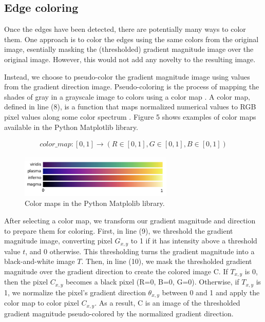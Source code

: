 \documentclass[runningheads]{llncs}
\begin{document}
\subsection{Edge coloring}

Once the edges have been detected, there are potentially many ways to color them. One approach is to color the edges using the same colors from the original image, esentially masking the (thresholded) gradient magnitude image over the original image. However, this would not add any novelty to the resulting image.

Instead, we choose to pseudo-color the gradient magnitude image using values from the gradient direction image. Pseudo-coloring is the process of mapping the shades of gray in a grayscale image to colors using a color map \cite{pseudo_color}. A color map, defined in line (8), is a function that maps normalized numerical values to RGB pixel values along some color spectrum \cite{color_map}. Figure 5 shows examples of color maps available in the Python Matplotlib library.

\begin{align}
color\_map: [0, 1] \rightarrow (R \in [0,1], G \in [0,1], B \in [0,1])
\end{align}

\begin{figure}
\centering
\includegraphics[height=2cm]{images/color_map.png}
\caption{Color maps in the Python Matplolib library.}
\label{fig:example}
\end{figure}

After selecting a color map, we transform our gradient magnitude and direction to prepare them for coloring. First, in line (9), we threshold the gradient magnitude image, converting pixel $G_{x,y}$ to 1 if it has intensity above a threshold value $t$, and 0 otherwise. This thresholding turns the gradient magnitude into a black-and-white image $T$. Then, in line (10), we mask the thresholded gradient magnitude over the gradient direction to create the colored image C. If $T_{x,y}$ is 0, then the pixel $C_{x, y}$ becomes a black pixel (R=0, B=0, G=0). Otherwise, if $T_{x,y}$ is 1, we normalize the pixel's gradient direction $\theta_{x, y}$ between 0 and 1 and apply the color map to color pixel $C_{x, y}$. As a result, C is an image of the thresholded gradient magnitude pseudo-colored by the normalized gradient direction.
\end{document}
